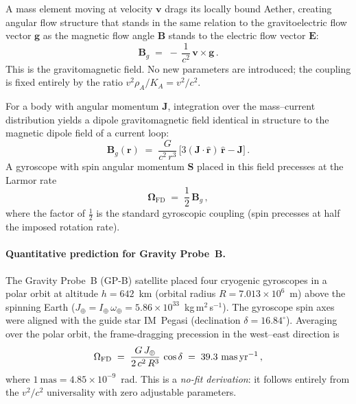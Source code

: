 ﻿\documentclass[12pt,letterpaper]{article}
\newcommand{\rhoa}{\rho_{\!A}}
\begin{document}
A mass element moving at velocity $\mathbf{v}$ drags its locally bound Aether,
creating angular flow structure that stands in the same relation to the
gravitoelectric flow vector $\mathbf{g}$ as the magnetic flow angle $\mathbf{B}$
stands to the electric flow vector $\mathbf{E}$:
\begin{equation}
  \mathbf{B}_g \;=\; -\,\frac{1}{c^2}\,\mathbf{v}\times\mathbf{g}\,.
  \label{eq:Bg-from-v}
\end{equation}
This is the gravitomagnetic field.  No new parameters are introduced; the coupling
is fixed entirely by the ratio $v^2 \rhoa / K_A = v^2/c^2$.

For a body with angular momentum $\mathbf{J}$, integration over the
mass--current distribution yields a dipole gravitomagnetic field identical in
structure to the magnetic dipole field of a current loop:
\begin{equation}
  \mathbf{B}_g(\mathbf{r})
  \;=\; \frac{G}{c^2\,r^3}\,
        \bigl[3(\mathbf{J}\cdot\hat{\mathbf{r}})\,\hat{\mathbf{r}}
              - \mathbf{J}\bigr]\,.
  \label{eq:Bg-dipole}
\end{equation}
A gyroscope with spin angular momentum $\mathbf{S}$ placed in this field
precesses at the Larmor rate
\begin{equation}
  \boldsymbol{\Omega}_{\mathrm{FD}}
  \;=\; \frac{1}{2}\,\mathbf{B}_g\,,
  \label{eq:FD-precession}
\end{equation}
where the factor of $\tfrac{1}{2}$ is the standard gyroscopic coupling
(spin precesses at half the imposed rotation rate).

\paragraph{Quantitative prediction for Gravity Probe~B.}
The Gravity Probe~B (GP-B) satellite placed four cryogenic gyroscopes in a
polar orbit at altitude $h = 642$~km (orbital radius $R = 7.013\times10^6$~m)
above the spinning Earth ($J_\oplus = I_\oplus\,\omega_\oplus
= 5.86\times10^{33}$~kg\,m$^2$\,s$^{-1}$).
The gyroscope spin axes were aligned with the guide star IM~Pegasi
(declination $\delta = 16.84^\circ$).
Averaging over the polar orbit, the frame-dragging precession in the
west--east direction is
\begin{equation}
  \Omega_{\mathrm{FD}}
  \;=\; \frac{G\,J_\oplus}{2\,c^2\,R^3}\,\cos\delta
  \;=\; 39.3~\text{mas\,yr}^{-1}\,,
  \label{eq:FD-GPB}
\end{equation}
where $1~\text{mas} = 4.85\times10^{-9}$~rad.
This is a \emph{no-fit derivation}: it follows entirely from the $v^2/c^2$
universality with zero adjustable parameters.
\end{document}
